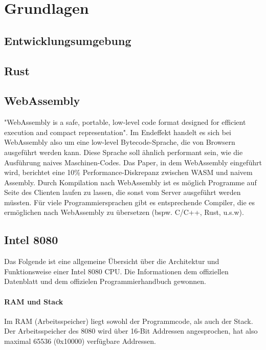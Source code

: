 \chapter{Grundlagen}

\section{Entwicklungsumgebung}

\section{Rust}

\section{WebAssembly}

"WebAssembly is a safe, portable, low-level code format designed for efficient execution and compact representation"\cite{WebAssemblyCoreSpecification}. Im Endeffekt handelt es sich bei WebAssembly also um eine low-level Bytecode-Sprache, die von Browsern ausgeführt werden kann. Diese Sprache soll ähnlich performant sein, wie die Ausführung naives Maschinen-Codes. Das Paper, in dem WebAssembly eingeführt wird, berichtet eine 10\% Performance-Diskrepanz zwischen WASM und naivem Assembly\cite{10.1145/3062341.3062363}. Durch Kompilation nach WebAssembly ist es möglich Programme auf Seite des Clienten laufen zu lassen, die sonst vom Server ausgeführt werden müssten.
Für viele Programmiersprachen gibt es entsprechende Compiler, die es ermöglichen nach WebAssembly zu übersetzen (bspw. C/C++, Rust, u.s.w).

\section{Intel 8080}

Das Folgende ist eine allgemeine Übersicht über die Architektur und Funktionsweise einer Intel 8080 CPU. Die Informationen dem offiziellen Datenblatt\cite{datasheet} und dem offizielen Programmierhandbuch\cite{progManual} gewonnen.

\subsubsection{RAM und Stack}

Im RAM (Arbeitsspeicher) liegt sowohl der Programmcode, als auch der Stack.
Der Arbeitsspeicher des 8080 wird über 16-Bit Addressen angesprochen, hat also maximal 65536 (0x10000) verfügbare Addressen.

